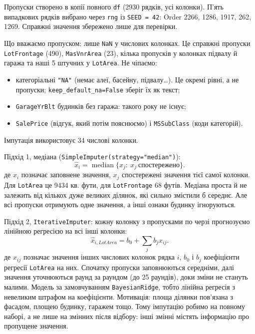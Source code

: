 \Needspace{28.4pt}


\answerheading
Пропуски створено в копії повного \texttt{df} (2930 рядків, усі
колонки). П'ять випадкових рядків вибрано через \texttt{rng} із
\texttt{SEED\ =\ 42}: Order 2266, 1286, 1917, 262, 1269. Справжні
значення збережено лише для перевірки.

Що вважаємо пропуском: лише \texttt{NaN} у числових колонках. Це
справжні пропуски \texttt{LotFrontage} (490), \texttt{MasVnrArea} (23),
кілька пропусків у колонках підвалу й гаража та наші 5 штучних у
\texttt{LotArea}. Не чіпаємо:

\begin{itemize}
\item
  категоріальні \texttt{"NA"} (немає алеї, басейну, підвалу\ldots). Це
  окремі рівні, а не пропуски; \texttt{keep\_default\_na=False} зберіг
  їх як текст;
\item
  \texttt{GarageYrBlt} будинків без гаража: такого року не існує;
\item
  \texttt{SalePrice} (відгук, який потім пояснюємо) і
  \texttt{MSSubClass} (коди категорій).
\end{itemize}

Імпутація використовує 34 числові колонки.

Підхід 1, медіана (\texttt{SimpleImputer(strategy="median")}):
\[\widehat x_i=\operatorname{median}\{x_j:\ x_j\ \text{спостережено}\}.\]
де \(\widehat x_i\) позначає заповнене значення, \(x_j\) спостережені
значення тієї самої колонки. Для \texttt{LotArea} це 9434 кв. фути, для
\texttt{LotFrontage} 68 футів. Медіана проста й не залежить від кількох
дуже великих ділянок, які сильно змістили б середнє. Але всі пропуски
отримують одне значення, а інші ознаки будинку ігноруються.

Підхід 2, \texttt{IterativeImputer}: кожну колонку з пропусками по черзі
прогнозуємо лінійною регресією на всі інші колонки:
\[\widehat x_{i,LotArea}=b_0+\sum_j b_j x_{ij}.\] де \(x_{ij}\) позначає
значення інших числових колонок рядка \(i\), \(b_0\) і \(b_j\)
коефіцієнти регресії \texttt{LotArea} на них. Спочатку пропуски
заповнюються середніми, далі значення уточнюються раунд за раундом (до
25 раундів), доки зміни не стануть малими. Модель за замовчуванням
\texttt{BayesianRidge}, тобто лінійна регресія з невеликим штрафом на
коефіцієнти. Мотивація: площа ділянки пов'язана з фасадом, площею
будинку, гаражем тощо. Тому імпутацію робимо на повному наборі, а не
лише на змінних після відбору: інші змінні містять інформацію про
пропущене значення.

